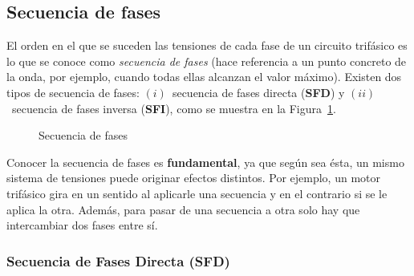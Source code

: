 	\subsection{Secuencia de fases}\label{sec:secuencia_fases}
	
	El orden en el que se suceden las tensiones de cada fase de un circuito trifásico es lo que se conoce como \textit{secuencia de fases} (hace referencia a un punto concreto de la onda, por ejemplo, cuando todas ellas alcanzan el valor máximo). Existen dos tipos de secuencia de fases: $(i)$~secuencia de fases directa (\textbf{SFD}) y $(ii)$~secuencia de fases inversa (\textbf{SFI}), como se muestra en la Figura~\ref{fig:secuencia_fases}. 
	\begin{figure}[H]
		\centering
		\hfil
		\caption{Secuencia de fases}
		\label{fig:secuencia_fases}
	\end{figure}
	
	
	Conocer la secuencia de fases es \textbf{fundamental}, ya que según sea ésta, un mismo sistema de tensiones puede originar efectos distintos. Por ejemplo, un motor trifásico gira en un sentido al aplicarle
	una secuencia y en el contrario si se le aplica la otra. Además, para pasar de una secuencia a otra solo hay que intercambiar dos fases entre sí.
	
	\subsubsection{Secuencia de Fases Directa (SFD)}
	
